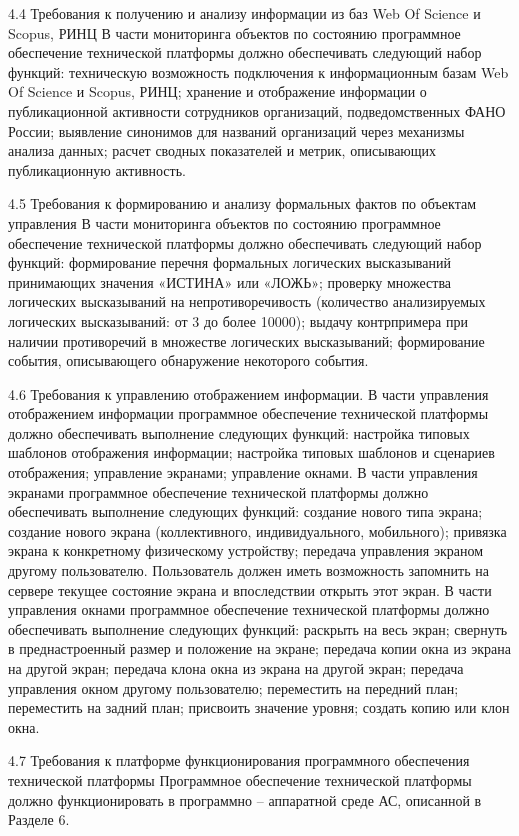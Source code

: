 4.4 Требования к получению и анализу информации из баз Web Of Science и Scopus, РИНЦ
В части мониторинга объектов по состоянию программное обеспечение технической  платформы  должно обеспечивать следующий набор функций:
техническую возможность подключения к информационным базам  Web Of Science и Scopus, РИНЦ;
хранение и отображение информации о публикационной активности сотрудников организаций, подведомственных ФАНО России;
выявление синонимов для названий организаций через механизмы анализа данных;
расчет сводных показателей и метрик, описывающих публикационную активность.

4.5 Требования к формированию и анализу формальных фактов по  объектам управления  
В части мониторинга объектов по состоянию программное обеспечение технической  платформы  должно обеспечивать следующий набор функций:
формирование перечня формальных логических  высказываний принимающих значения   «ИСТИНА» или «ЛОЖЬ»;
проверку множества логических высказываний на непротиворечивость (количество анализируемых логических высказываний:  от 3 до более 10000);
выдачу контрпримера при наличии противоречий в множестве логических высказываний;
формирование события, описывающего обнаружение некоторого события.

4.6 Требования к управлению отображением информации. 
В части управления отображением информации программное обеспечение технической платформы должно обеспечивать выполнение следующих функций:
настройка типовых шаблонов отображения информации;
настройка типовых шаблонов и сценариев отображения;
управление экранами;
управление окнами. 
В части управления экранами программное обеспечение технической платформы должно обеспечивать выполнение следующих функций:
создание нового типа экрана;
создание нового экрана (коллективного, индивидуального, мобильного);
привязка экрана к конкретному физическому устройству;
передача управления экраном другому пользователю.
Пользователь должен иметь возможность запомнить на сервере текущее состояние экрана и впоследствии открыть этот экран. 
В части управления окнами программное обеспечение технической платформы должно обеспечивать выполнение следующих функций:
раскрыть на весь экран;
свернуть в преднастроенный размер и положение на экране;
передача копии окна из экрана на другой экран;
передача клона окна из экрана на другой экран;
передача управления окном другому пользователю;
переместить на передний план;
переместить на задний план;
присвоить значение уровня;
создать копию или клон окна.

4.7 Требования к платформе функционирования программного обеспечения технической платформы
Программное обеспечение технической платформы должно функционировать в программно – аппаратной среде АС, описанной в Разделе 6.

